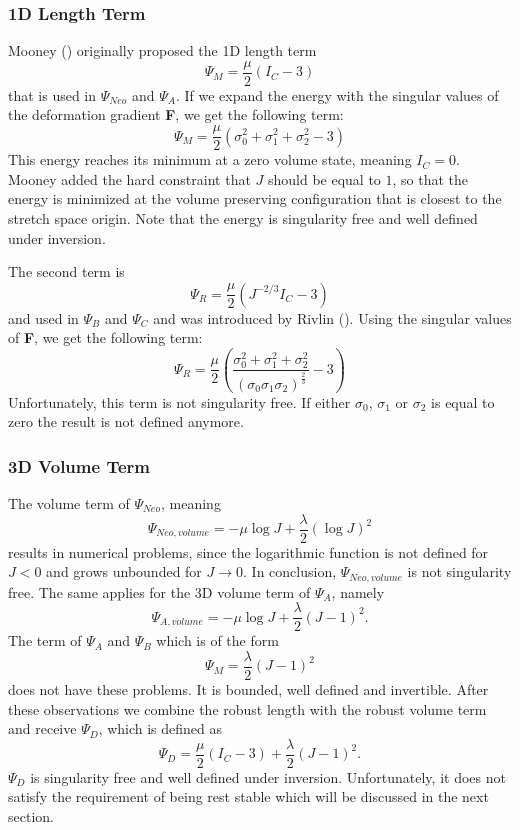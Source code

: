 \subsubsection{1D Length Term}
Mooney (\cite{mooney1940theory}) originally proposed the 1D length term 
\[
\Psi_{M}=\frac{\mu}{2}\left(I_{C}-3\right)
\]
that is used in $\Psi_{Neo}$ and $\Psi_{A}$. If we expand the energy with the singular values of the deformation gradient \textbf{F}, we get the following term:
\[
\Psi_{M}=\frac{\mu}{2}\left(\sigma_{0}^2 + \sigma_{1}^2 + \sigma_{2}^2 - 3\right)
\]
This energy reaches its minimum at a zero volume state, meaning $I_{C}=0$. Mooney added the hard constraint that $J$ should be equal to $1$, so that the energy is minimized at the volume preserving configuration that is closest to the stretch space origin. Note that the energy is singularity free and well defined under inversion.

The second term is
\[
\Psi_{R} = \frac{\mu}{2}\left(J^{-2 / 3} I_{C}-3\right)
\]
and used in $\Psi_{B}$ and $\Psi_{C}$ and was introduced by Rivlin (\cite{rivlin1948large}). Using the singular values of \textbf{F}, we get the following term:
\[
\Psi_{R} = \frac{\mu}{2}\left(\frac{\sigma_{0}^2 + \sigma_{1}^2 + \sigma_{2}^2}{(\sigma_{0}  \sigma_{1}  \sigma_{2})^\frac{2}{3}}
 - 3\right)
\]
Unfortunately, this term is not singularity free. If either $\sigma_{0}$, $\sigma_{1}$ or $\sigma_{2}$ is equal to zero the result is not defined anymore.

\subsubsection{3D Volume Term}
The volume term of $\Psi_{Neo}$, meaning
\[
\Psi_{Neo, volume} = -\mu \log J+\frac{\lambda}{2}(\log J)^{2}
\]
results in numerical problems, since the logarithmic function is not defined for $J<0$ and grows unbounded for $J \rightarrow 0$. In conclusion, $\Psi_{Neo, volume}$ is not singularity free. 
The same applies for the 3D volume term of $\Psi_{A}$, namely
\[
\Psi_{A, volume} = -\mu \log J+\frac{\lambda}{2}(J-1)^{2}.
\]
The term of $\Psi_{A}$ and $\Psi_{B}$ which is of the form
\[
\Psi_{M} = \frac{\lambda}{2}(J-1)^{2}
\]
does not have these problems. It is bounded, well defined and invertible. After these observations we combine the robust length with the robust volume term and receive $\Psi_D$, which is defined as
\[
\Psi_{D} = \frac{\mu}{2}\left(I_{C}-3\right) +\frac{\lambda}{2}(J-1)^{2}.
\]
$\Psi_{D}$ is singularity free and well defined under inversion. Unfortunately, it does not satisfy the requirement of being rest stable which will be discussed in the next section.

